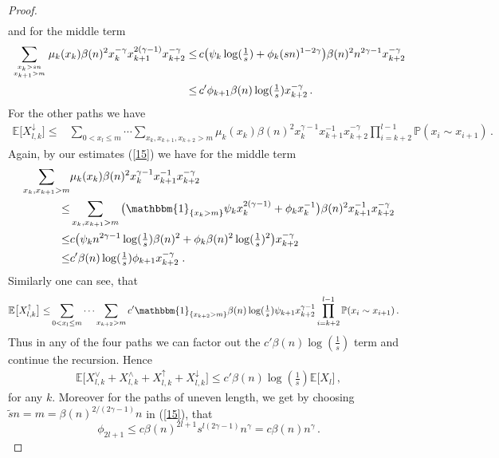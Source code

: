 \documentclass[12pt,a4paper]{article}
\numberwithin{equation}{section}
\begin{document}
\begin{proof}
\begin{align*}
    \end{align*}
    and for the middle term
    \begin{align*}
        \sum_{x_k>sn\atop x_{k+1}>m} \mu_k(x_k)\beta(n)^2x_k^{-\gamma}x_{k+1}^{2(\gamma-1)}x_{k+2}^{-\gamma}
    \le &\,c\big(\psi_k \log(\tfrac1s)+\phi_k(sn)^{1-2\gamma}\big)\beta(n)^2n^{2\gamma-1}x_{k+2}^{-\gamma}
         \\ \le &\,c'\phi_{k+1}\beta(n)\log(\tfrac1s)x_{k+2}^{-\gamma}\,.
    \end{align*}
    For the other paths we have
    \begin{align*}
         \mathbb E\big[X_{l,k}^{\downarrow}\big]\le &\sum_{0<x_l\le m} \cdots \sum_{x_k,x_{k+1},x_{k+2}>m} \mu_k(x_k)\beta(n)^2x_k^{\gamma-1}x_{k+1}^{-1}x_{k+2}^{-\gamma}\prod_{i=k+2}^{l-1} \mathbb P (x_i\sim x_{i+1})\,.
    \end{align*}
    Again, by our estimates (\ref{15}) we have for the middle term 
    \begin{align*}
         \sum_{x_k,x_{k+1}>m} & \mu_k(x_k)\beta(n)^2x_k^{\gamma-1}x_{k+1}^{-1}x_{k+2}^{-\gamma}
        \\\le & \sum_{x_k,x_{k+1}>m} \big(\mathbbm{1}_{\{x_k>m\}}\psi_kx_k^{2(\gamma-1)}+\phi_kx_k^{-1}\big)\beta(n)^2x_{k+1}^{-1}x_{k+2}^{-\gamma}
        \\ \le & c\big( \psi_k n^{2\gamma-1}\log(\tfrac1s)\beta(n)^2+\phi_k \beta(n)^2\log(\tfrac1s)^2\big)x_{k+2}^{-\gamma}
         \\ \le & c'\beta(n)\log(\tfrac1s) \phi_{k+1}  x_{k+2}^{-\gamma} \;.
    \end{align*}
    Similarly one can see, that 
     \begin{align*}
         \mathbb E\big[X_{l,k}^{\uparrow}\big]\le &\sum_{0<x_l\le m} \cdots \sum_{x_{k+2}>m} c'\mathbbm{1}_{\{x_{k+2}>m\}}\beta(n)\log(\tfrac1s)\psi_{k+1}x_{k+2}^{\gamma-1}\prod_{i=k+2}^{l-1} \mathbb P (x_i\sim x_{i+1})\,.
    \end{align*}
    Thus in any of the four paths we can factor out the $c'\beta(n)\log(\tfrac1s)$ term and continue the recursion. Hence
    \begin{align*}
         \mathbb E\big[X_{l,k}^{\vee}+X_{l,k}^{\wedge}+X_{l,k}^{\uparrow}+X_{l,k}^{\downarrow}\big]\le c'\beta(n)\log(\tfrac1s) \mathbb E\big[X_{l}\big]\,,
    \end{align*}
    for any $k$. Moreover for the paths of uneven length, we get by choosing $\tilde s n=m=\beta(n)^{2/(2\gamma-1)}n$ in (\ref{15}),   that
    $$\phi_{2l+1}\le c \beta(n)^{2l+1}s^{l(2\gamma-1)}n^\gamma = c \beta(n) n^\gamma \,.$$

\end{proof}
\end{document}
